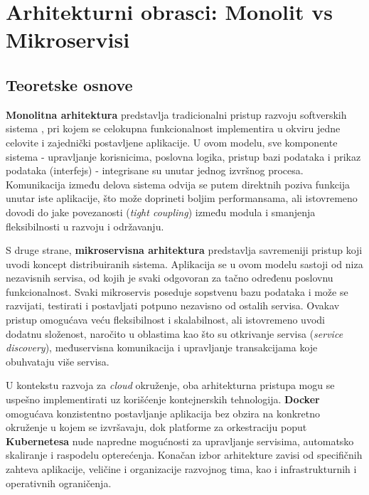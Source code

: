 \documentclass[12pt]{article}
\begin{document}
    \section{Arhitekturni obrasci: Monolit vs Mikroservisi}
    \subsection{Teoretske osnove}

    \textbf{Monolitna arhitektura} predstavlja tradicionalni pristup razvoju softverskih sistema
    , pri kojem se celokupna funkcionalnost implementira u okviru jedne celovite i 
    zajednički postavljene aplikacije. U ovom modelu, sve komponente sistema - upravljanje 
    korisnicima, poslovna logika, pristup bazi podataka i prikaz podataka 
    (interfejs) - integrisane su unutar jednog izvršnog procesa. Komunikacija između delova 
    sistema odvija se putem direktnih poziva funkcija unutar iste aplikacije, što može 
    doprineti boljim performansama, ali istovremeno dovodi do 
    jake povezanosti (\textit{tight coupling}) između modula i smanjenja fleksibilnosti u 
    razvoju i održavanju.

    S druge strane, \textbf{mikroservisna arhitektura} predstavlja savremeniji pristup 
    koji uvodi koncept distribuiranih sistema. Aplikacija se u ovom modelu sastoji od niza 
    nezavisnih servisa, od kojih je svaki odgovoran za tačno određenu poslovnu funkcionalnost. 
    Svaki mikroservis poseduje sopstvenu bazu podataka i može se razvijati, testirati i 
    postavljati potpuno nezavisno od ostalih servisa. Ovakav pristup omogućava veću fleksibilnost 
    i skalabilnost, ali istovremeno uvodi dodatnu složenost, naročito u oblastima kao što su 
    otkrivanje servisa (\textit{service discovery}), međuservisna komunikacija i upravljanje 
    transakcijama koje obuhvataju više servisa.

    \newpage
    U kontekstu razvoja za \textit{cloud} okruženje, oba arhitekturna pristupa mogu se 
    uspešno implementirati uz korišćenje kontejnerskih tehnologija. 
    \textbf{Docker} omogućava konzistentno postavljanje aplikacija bez obzira na konkretno 
    okruženje u kojem se izvršavaju, dok platforme za orkestraciju poput 
    \textbf{Kubernetesa} \cite{kubernetes} nude napredne mogućnosti za upravljanje servisima, automatsko 
    skaliranje i raspodelu opterećenja. Konačan izbor arhitekture zavisi od specifičnih zahteva 
    aplikacije, veličine i organizacije razvojnog tima, kao i infrastrukturnih i operativnih 
    ograničenja.
    
\end{document}
